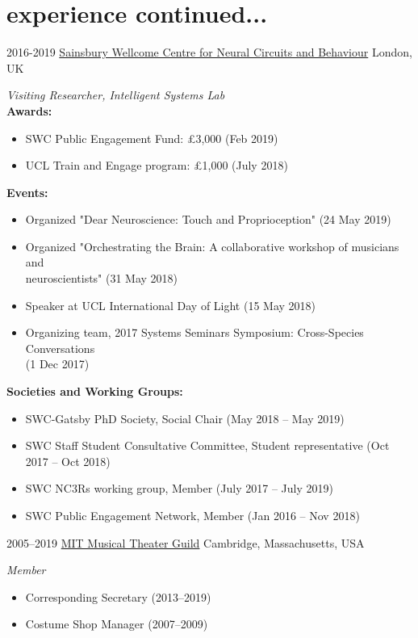 \documentclass[]{friggeri-cv}
\begin{document}
\newpage
\section{experience continued...}
\begin{entrylist}
\entry
    {2016-2019}
    {\href{https://www.ucl.ac.uk/swc/}{Sainsbury Wellcome Centre for Neural Circuits and Behaviour}}
    {London, UK}
    {\emph{Visiting Researcher, Intelligent Systems Lab} \\
	\textbf{Awards:}
	\begin{itemize}
		\item SWC Public Engagement Fund: £3,000 (Feb 2019)
		\item UCL Train and Engage program: £1,000 (July 2018)
	\end{itemize}
	\textbf{Events:}
	\begin{itemize}
		\item Organized "Dear Neuroscience: Touch and Proprioception" (24 May 2019)
		\item Organized "Orchestrating the Brain: A collaborative workshop of musicians and\\ neuroscientists" (31 May 2018)
		\item Speaker at UCL International Day of Light (15 May 2018)
		\item Organizing team, 2017 Systems Seminars Symposium: Cross-Species Conversations \\(1 Dec 2017)
	\end{itemize}
	\textbf{Societies and Working Groups:}
	\begin{itemize}
		\item SWC-Gatsby PhD Society, Social Chair (May 2018 -- May 2019)
		\item SWC Staff Student Consultative Committee, Student representative (Oct 2017 -- Oct 2018)
		\item SWC NC3Rs working group, Member (July 2017 -- July 2019)
		\item SWC Public Engagement Network, Member (Jan 2016 -- Nov 2018)
	\end{itemize}
	}
  \entry
	{2005--2019}
	{\href{http://web.mit.edu/mtg/www/}{MIT Musical Theater Guild}}
	{Cambridge, Massachusetts, USA}
	{\emph{Member}
	\begin{itemize}
		\item Corresponding Secretary (2013--2019)
		\item Costume Shop Manager (2007--2009)

\end{itemize}}
\end{entrylist}
\end{document}
